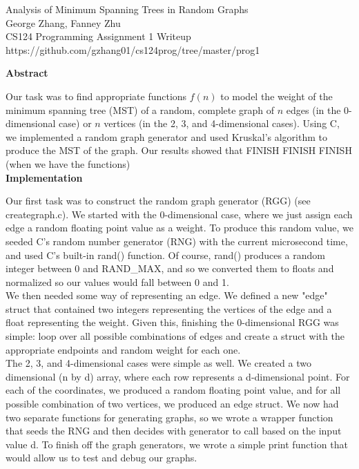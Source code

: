 \documentclass[12pt]{article}
\begin{document}
\begin{center}
Analysis of Minimum Spanning Trees in Random Graphs \\
George Zhang, Fanney Zhu \\
CS124 Programming Assignment 1 Writeup \\
https://github.com/gzhang01/cs124prog/tree/master/prog1 \\
\end{center}

\bigskip

\textbf{Abstract}

Our task was to find appropriate functions $f(n)$ to model the weight of the minimum spanning tree (MST) of a random, complete graph of $n$ edges (in the 0-dimensional case) or $n$ vertices (in the 2, 3, and 4-dimensional cases). Using C, we implemented a random graph generator and used Kruskal's algorithm to produce the MST of the graph. Our results showed that {\color{red} FINISH FINISH FINISH (when we have the functions)} \\

\textbf{Implementation}

Our first task was to construct the random graph generator (RGG) (see creategraph.c). We started with the 0-dimensional case, where we just assign each edge a random floating point value as a weight. To produce this random value, we seeded C's random number generator (RNG) with the current microsecond time, and used C's built-in rand() function. Of course, rand() produces a random integer between 0 and RAND\_MAX, and so we converted them to floats and normalized so our values would fall between 0 and 1. \\

We then needed some way of representing an edge. We defined a new "edge" struct that contained two integers representing the vertices of the edge and a float representing the weight. Given this, finishing the 0-dimensional RGG was simple: loop over all possible combinations of edges and create a struct with the appropriate endpoints and random weight for each one. \\

The 2, 3, and 4-dimensional cases were simple as well. We created a two dimensional (n by d) array, where each row represents a d-dimensional point. For each of the coordinates, we produced a random floating point value, and for all possible combination of two vertices, we produced an edge struct. We now had two separate functions for generating graphs, so we wrote a wrapper function that seeds the RNG and then decides with generator to call based on the input value d. To finish off the graph generators, we wrote a simple print function that would allow us to test and debug our graphs. \\
\end{document}
